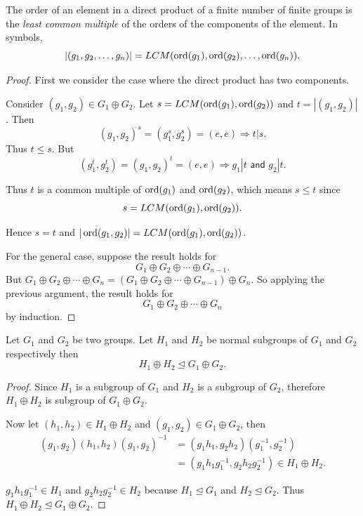 \begin{theorem}
    The order of an element in a direct product of a finite number of finite groups is the 
    \textit{least common multiple} of the orders of the components of the element.
    In symbols,
    \[
        |(g_1, g_2, \ldots, g_n)| = LCM(\operatorname{ord}(g_1), \operatorname{ord}(g_2), \ldots, \operatorname{ord}(g_n)).
    \]
\end{theorem}
\begin{proof}
    First we consider the case where the direct product has two components. 
    
    Consider $(g_1, g_2) \in G_1 \oplus G_2$.
    Let $s = LCM(\operatorname{ord}(g_1), \operatorname{ord}(g_2))$ and $t = |(g_1, g_2)|$. Then
    \[
        (g_1, g_2)^s = (g_1^s, g_2^s) = (e, e) \Longrightarrow t|s.
    \]
    Thus $t \leq s$. But 
    \[
        (g_1^t, g_2^t) = (g_1, g_2)^t = (e,e) \Longrightarrow g_1 | t \textsf{ and } g_2 | t.
    \]

    Thus $t$ is a common multiple of $\operatorname{ord}(g_1)$ and $\operatorname{ord}(g_2)$, which means $s \leq t$ since 
    \[s = LCM(\operatorname{ord}(g_1), \operatorname{ord}(g_2)).\]
    
    Hence $s = t$ and $|\operatorname{ord}(g_1, g_2)| = LCM(\operatorname{ord}(g_1), \operatorname{ord}(g_2))$.

    For the general case, suppose the result holds for 
    \[
        G_1 \oplus G_2 \oplus \cdots \oplus G_{n-1}.
    \]
    But $G_1 \oplus G_2 \oplus \cdots \oplus G_n = (G_1 \oplus G_2 \oplus \cdots \oplus G_{n-1}) \oplus G_n$. So applying 
    the previous argument, the result holds for 
    \[
        G_1 \oplus G_2 \oplus \cdots \oplus G_{n}
    \]
    by induction.
\end{proof}

\begin{theorem}
    Let $G_1$ and $G_2$ be two groups. Let $H_1$ and $H_2$ be normal subgroups of
    $G_1$ and $G_2$ respectively then 
    \[
        H_1 \oplus H_2 \unlhd G_1 \oplus G_2.
    \]
\end{theorem}
\begin{proof}
    Since $H_1$ is a subgroup of $G_1$ and $H_2$ is a subgroup of $G_2$, therefore
    $H_1 \oplus H_2$ is subgroup of $G_1 \oplus G_2$.

    Now let $(h_1, h_2) \in H_1 \oplus H_2$ and $(g_1, g_2) \in G_1 \oplus G_2$, then 
    \begin{align*}
        (g_1, g_2)(h_1, h_2)(g_1, g_2)^{-1} &= (g_1 h_1, g_2 h_2)(g^{-1}_1, g^{-1}_2)\\
        &= (g_1 h_1 g^{-1}_1, g_2 h_2 g^{-1}_2) \in H_1 \oplus H_2.
    \end{align*}

    $g_1 h_1 g^{-1}_1 \in H_1$ and $g_2 h_2 g^{-1}_2 \in H_2$ because $H_1 \unlhd G_1$ and 
    $H_2 \unlhd G_2$. Thus $H_1 \oplus H_2 \unlhd G_1 \oplus G_2$.
\end{proof}

